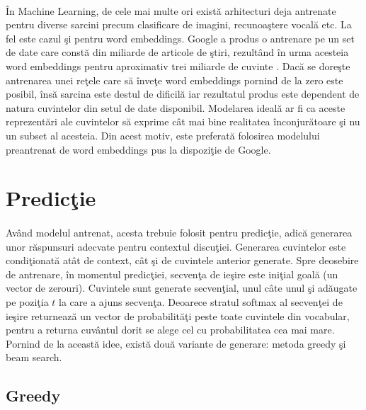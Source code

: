 \paragraph{}
\^ In Machine Learning, de cele mai multe ori exist\u a arhitecturi deja antrenate pentru diverse sarcini precum clasificare de imagini, recunoa\c stere vocal\u a etc. La fel este cazul \c si pentru word embeddings. Google a produs o antrenare pe un set de date care const\u a din miliarde de articole de \c stiri, rezult\^ and \^ in urma acesteia word embeddings pentru aproximativ trei miliarde de cuvinte \cite{word2vec}. Dac\u a se dore\c ste antrenarea unei re\c tele care s\u a \^ inve\c te word embeddings pornind de la zero este posibil, \^ ins\u a sarcina este destul de dificil\u a iar rezultatul produs este dependent de natura cuvintelor din setul de date disponibil. Modelarea ideal\u a ar fi ca aceste reprezent\u ari ale cuvintelor s\u a exprime c\^ at mai bine realitatea \^ inconjur\u atoare \c si nu un subset al acesteia. Din acest motiv, este preferat\u a folosirea modelului preantrenat de word embeddings pus la dispozi\c tie de Google.

\section{Predic\c tie}

\paragraph{}
Av\^ and modelul antrenat, acesta trebuie folosit pentru predic\c tie, adic\u a generarea unor r\u aspunsuri adecvate pentru contextul discu\c tiei. Generarea cuvintelor este condi\c tionat\u a at\^ at de context, c\^ at \c si de cuvintele anterior generate. Spre deosebire de antrenare, \^ in momentul predic\c tiei, secven\c ta de ie\c sire este ini\c tial goal\u a (un vector de zerouri). Cuvintele sunt generate secven\c tial, unul c\^ ate unul \c si ad\u augate pe pozi\c tia \(t\) la care a ajuns secven\c ta. Deoarece stratul softmax al secven\c tei de ie\c sire returneaz\u a un vector de probabilit\u a\c ti peste toate cuvintele din vocabular, pentru a returna cuv\^ antul dorit se alege cel cu probabilitatea cea mai mare. Pornind de la aceast\u a idee, exist\u a dou\u a variante de generare: metoda greedy \c si beam search.

\subsection{Greedy}

